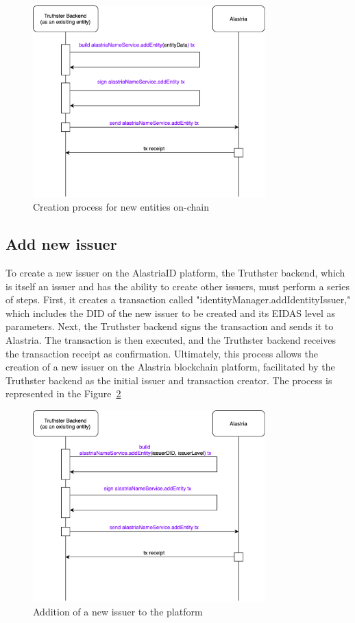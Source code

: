 \documentclass[target=mst,aauheader=]{thud}
\begin{document}
\begin{figure}
    \centering
    \includegraphics[width=0.8\textwidth]{images/createNewGeneralEntity.png}
    \caption{Creation process for new entities on-chain}
    \label{fig:createNewGeneralEntity}
\end{figure}

\subsection{Add new issuer}

To create a new issuer on the AlastriaID platform, the Truthster backend, which is itself an issuer and has the ability to create other issuers, must perform a series of steps. First, it creates a transaction called "identityManager.addIdentityIssuer," which includes the DID of the new issuer to be created and its EIDAS level as parameters. Next, the Truthster backend signs the transaction and sends it to Alastria. The transaction is then executed, and the Truthster backend receives the transaction receipt as confirmation. Ultimately, this process allows the creation of a new issuer on the Alastria blockchain platform, facilitated by the Truthster backend as the initial issuer and transaction creator.
The process is represented in the Figure~\ref{fig:addNewIssuer}

\begin{figure}
    \centering
    \includegraphics[width=0.8\textwidth]{images/addNewIssuer.png}
    \caption{Addition of a new issuer to the platform}
    \label{fig:addNewIssuer}
\end{figure}
\end{document}

